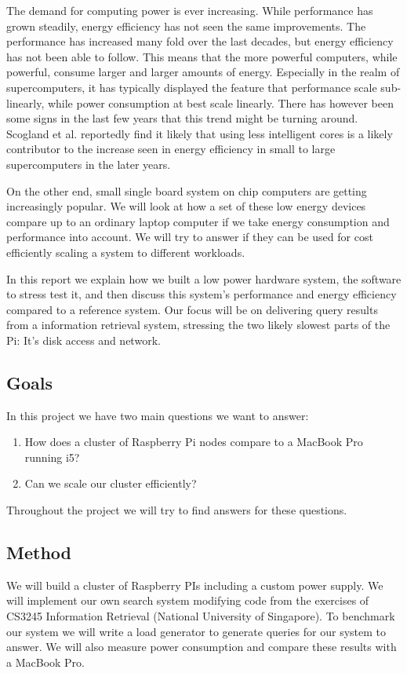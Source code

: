 The demand for computing power is ever increasing. While performance has grown steadily, energy efficiency has not seen the same improvements.
The performance has increased many fold over the last decades, but energy efficiency has not been able to follow. This means that the more powerful computers, while powerful, consume larger and larger amounts of energy.
Especially in the realm of supercomputers, it has typically displayed the feature that performance scale sub-linearly, while power consumption at best scale linearly.
There has however been some signs in the last few years that this trend might be turning around\cite{green500}.
Scogland et al.\cite{green500} reportedly find it likely that using less intelligent cores is a likely contributor to the increase seen in energy efficiency in small to large supercomputers in the later years.

On the other end, small single board system on chip computers are getting increasingly popular.
We will look at how a set of these low energy devices compare up to an ordinary laptop computer if we take energy consumption and performance into account. We will try to answer if they can be used for cost efficiently scaling a system to different workloads.

In this report we explain how we built a low power hardware system, the software to stress test it, and then discuss this system's performance and energy efficiency compared to a reference system. Our focus will be on delivering query results from a information retrieval system, stressing the two likely slowest parts of the Pi:
It's disk access and network.

\subsection{Goals}
In this project we have two main questions we want to answer:
\begin{enumerate}
\item How does a cluster of Raspberry Pi nodes compare to a MacBook Pro running i5?
\item Can we scale our cluster efficiently?
\end{enumerate}

Throughout the project we will try to find answers for these questions.

\subsection{Method}
We will build a cluster of Raspberry PIs including a custom power supply. We will implement our own search system modifying code from the exercises of CS3245 Information Retrieval (National University of Singapore). To benchmark our system we will write a load generator to generate queries for our system to answer. We will also measure power consumption and compare these results with a MacBook Pro.


